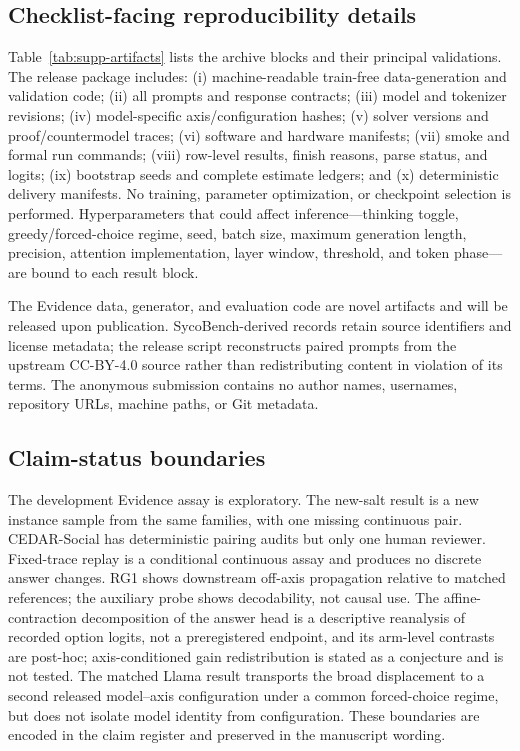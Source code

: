 \documentclass[letterpaper]{article}
\begin{document}
\subsection{Checklist-facing reproducibility details}

Table~\ref{tab:supp-artifacts} lists the archive blocks and their principal validations. The release package includes: (i) machine-readable train-free data-generation and validation code; (ii) all prompts and response contracts; (iii) model and tokenizer revisions; (iv) model-specific axis/configuration hashes; (v) solver versions and proof/countermodel traces; (vi) software and hardware manifests; (vii) smoke and formal run commands; (viii) row-level results, finish reasons, parse status, and logits; (ix) bootstrap seeds and complete estimate ledgers; and (x) deterministic delivery manifests.  No training, parameter optimization, or checkpoint selection is performed.  Hyperparameters that could affect inference---thinking toggle, greedy/forced-choice regime, seed, batch size, maximum generation length, precision, attention implementation, layer window, threshold, and token phase---are bound to each result block.

The Evidence data, generator, and evaluation code are novel artifacts and will be released upon publication.  SycoBench-derived records retain source identifiers and license metadata; the release script reconstructs paired prompts from the upstream CC-BY-4.0 source rather than redistributing content in violation of its terms.  The anonymous submission contains no author names, usernames, repository URLs, machine paths, or Git metadata.

\subsection{Claim-status boundaries}

The development Evidence assay is exploratory.  The new-salt result is a new instance sample from the same families, with one missing continuous pair.  CEDAR-Social has deterministic pairing audits but only one human reviewer.  Fixed-trace replay is a conditional continuous assay and produces no discrete answer changes.  RG1 shows downstream off-axis propagation relative to matched references; the auxiliary probe shows decodability, not causal use.  The affine-contraction decomposition of the answer head is a descriptive reanalysis of recorded option logits, not a preregistered endpoint, and its arm-level contrasts are post-hoc; axis-conditioned gain redistribution is stated as a conjecture and is not tested. The matched Llama result transports the broad displacement to a second released model--axis configuration under a common forced-choice regime, but does not isolate model identity from configuration.  These boundaries are encoded in the claim register and preserved in the manuscript wording.


\end{document}
